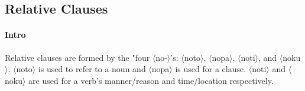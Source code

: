 \documentclass[11pt]{article}
\begin{document}



\subsection{Relative Clauses} \label{sec:relative-clauses}

\paragraph{Intro}
Relative clauses are formed by the "four $\langle$no-$\rangle$'s:
$\langle$noto$\rangle$,
$\langle$nopa$\rangle$,
$\langle$noti$\rangle$, and
$\langle$noku$\rangle$.
$\langle$noto$\rangle$ is used to refer to a noun and
$\langle$nopa$\rangle$ is used for a clause.
$\langle$noti$\rangle$ and $\langle$noku$\rangle$
are used for a verb's manner/reason and time/location respectively.
\end{document}
